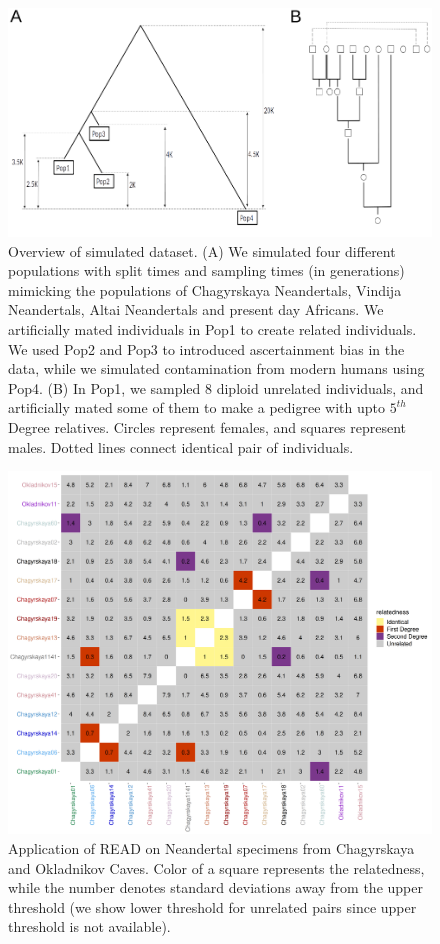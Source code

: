 \documentclass[12pt, letterpaper]{article}
\begin{document}
\begin{figure}[h!]
    \includegraphics[width=18cm]{plots/inkscape_finalImg/pedigree_both.png}
    \centering
    \caption{Overview of simulated dataset. (A) We simulated four different populations with split times and sampling times (in generations) mimicking the populations of Chagyrskaya Neandertals, Vindija Neandertals, Altai Neandertals and present day Africans. We artificially mated individuals in Pop1 to create related individuals. We used Pop2 and Pop3 to introduced ascertainment bias in the data, while we simulated contamination from modern humans using Pop4. (B) In Pop1, we sampled 8 diploid unrelated individuals, and artificially mated some of them to make a pedigree with upto $5^{th}$ Degree relatives. Circles represent females, and squares represent males. Dotted lines connect identical pair of individuals.}
    \label{figS10:pedigree}
    
\end{figure}


\begin{figure}[h!]
    \includegraphics[width=18cm]{supplementary_info/plots/fil0_read_plot.png}
    \centering
    \caption{Application of READ on Neandertal specimens from Chagyrskaya and Okladnikov Caves. Color of a square represents the relatedness, while the number denotes standard deviations away from the upper threshold (we show lower threshold for unrelated pairs since upper threshold is not available).}
    \label{figS2:Chagyrskaya_READ}
\end{figure}
\end{document}
